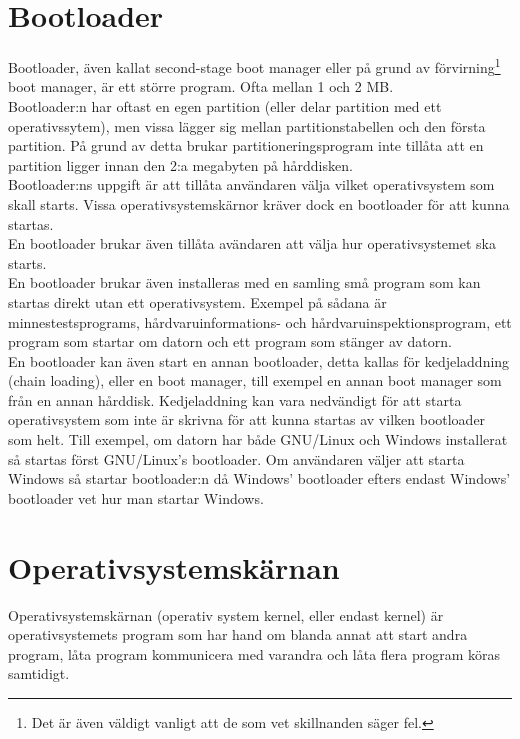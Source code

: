 \documentclass[12pt,a4paper]{article}
\begin{document}
\section*{Bootloader}

Bootloader, även kallat second-stage boot manager eller
på grund av förvirning\footnote{Det är även väldigt vanligt
att de som vet skillnanden säger fel.} boot manager, är ett
större program. Ofta mellan 1 och 2 MB.
\\

\noindent
Bootloader:n har oftast en egen partition (eller delar
partition med ett operativssytem), men vissa lägger sig
mellan partitionstabellen och den första partition.
På grund av detta brukar partitioneringsprogram inte
tillåta att en partition ligger innan den 2:a megabyten
på hårddisken.
\\

\noindent
Bootloader:ns uppgift är att tillåta användaren välja
vilket operativsystem som skall starts. Vissa
operativsystemskärnor kräver dock en bootloader
för att kunna startas.
\\

\noindent
En bootloader brukar även tillåta avändaren att
välja hur operativsystemet ska starts.
\\

\noindent
En bootloader brukar även installeras med en samling
små program som kan startas direkt utan ett
operativsystem. Exempel på sådana är minnestestsprograms,
hårdvaruinformations- och hårdvaruinspektionsprogram,
ett program som startar om datorn och ett program som
stänger av datorn.
\\

\noindent
En bootloader kan även start en annan bootloader,
detta kallas för kedjeladdning (chain loading), eller
en boot manager, till exempel en annan boot manager
som från en annan hårddisk. Kedjeladdning kan vara
nedvändigt för att starta operativsystem som inte
är skrivna för att kunna startas av vilken bootloader
som helt. Till exempel, om datorn har både GNU/Linux
och Windows installerat så startas först GNU/Linux's
bootloader. Om användaren väljer att starta Windows
så startar bootloader:n då Windows' bootloader efters
endast Windows' bootloader vet hur man startar Windows.


\section*{Operativsystemskärnan}

Operativsystemskärnan (operativ system kernel, eller
endast kernel) är operativsystemets program som har
hand om blanda annat att start andra program, låta
program kommunicera med varandra och låta flera
program köras samtidigt.
\\
\end{document}
